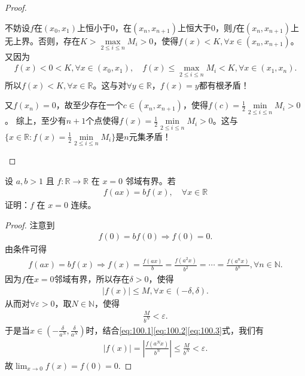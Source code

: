 \documentclass[../../main.tex]{subfiles}%
\begin{document}
\begin{proof}
\begin{enumerate}
不妨设\(f\)在\(( x_0,x_1 )\)上恒小于\(0\)，在\(( x_n,x_{n + 1} )\)上恒大于\(0\)，则\(f\)在\(( x_n,x_{n + 1} )\)上无上界。否则，存在\(K>\underset{2\leqslant  i\leqslant  n}{\max}M_i>0\)，使得\(f( x ) <K,\forall x\in ( x_n,x_{n + 1} )\)。又因为
\begin{align*}
f( x ) <0<K,\forall x\in ( x_0,x_1 ),\quad f( x ) \leqslant \underset{2\leqslant  i\leqslant  n}{\max}M_i<K,\forall x\in ( x_1,x_n ).
\end{align*}
所以\(f( x ) <K,\forall x\in \mathbb{R} \)。这与对\(\forall y\in \mathbb{R} \)，\(f( x ) =y\)都有根矛盾！

又\(f( x_n ) =0\)，故至少存在一个\(c\in ( x_n,x_{n + 1} )\)，使得\(f( c ) =\frac{1}{2}\underset{2\leqslant  i\leqslant  n}{\min}M_i>0\)。
综上，至少有\(n + 1\)个点使得\(f( x ) =\frac{1}{2}\underset{2\leqslant  i\leqslant  n}{\min}M_i>0\)。这与\(\{ x\in \mathbb{R} :f( x ) =\frac{1}{2}\underset{2\leqslant  i\leqslant  n}{\min}M_i \}\)是\(n\)元集矛盾！
\end{enumerate}
\end{proof}

\begin{example}
设 \(a,b > 1\) 且 \(f: \mathbb{R} \to \mathbb{R}\) 在 \(x = 0\) 邻域有界。若
\begin{align*}
f(ax) = bf(x),\quad \forall x \in \mathbb{R}
\end{align*}
证明：\(f\) 在 \(x = 0\) 连续。 
\end{example}
\begin{proof}
注意到
\begin{align*}
f(0) = bf(0) \Rightarrow f(0) = 0.
\end{align*}
由条件可得
\begin{align}
f(ax) = bf(x) \Rightarrow f(x) = \frac{f(ax)}{b} = \frac{f(a^2x)}{b^2} = \cdots = \frac{f(a^nx)}{b^n}, \forall n \in \mathbb{N}. \label{eq:100.1}
\end{align}
因为\(f\)在\(x=0\)邻域有界，所以存在\(\delta > 0\)，使得
\begin{align}
|f(x)| \leqslant M, \forall x \in (-\delta, \delta). \label{eq:100.2}
\end{align}
从而对\(\forall \varepsilon > 0\)，取\(N \in \mathbb{N}\)，使得
\begin{align}
\frac{M}{b^N} < \varepsilon. \label{eq:100.3}
\end{align}
于是当\(x \in \left( -\frac{\delta}{a^N}, \frac{\delta}{a^N} \right)\)时，结合\eqref{eq:100.1}\eqref{eq:100.2}\eqref{eq:100.3}式，我们有
\begin{align*}
|f(x)| = \left| \frac{f(a^Nx)}{b^N} \right| \leqslant \frac{M}{b^N} < \varepsilon.
\end{align*}
故\(\lim_{x \to 0} f(x) = f(0) = 0.\)
\end{proof}
\end{document}
